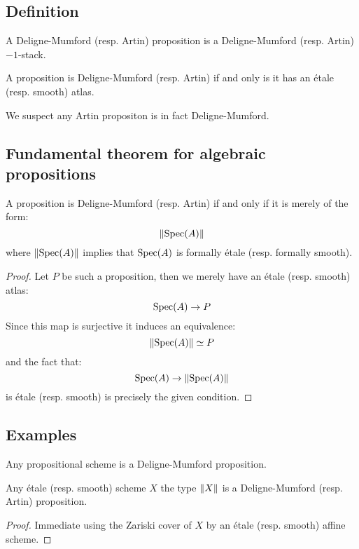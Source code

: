\subsection{Definition}

\begin{definition}
A Deligne-Mumford (resp. Artin) proposition is a Deligne-Mumford (resp. Artin) $-1$-stack.
\end{definition}

\begin{remark}
A proposition is Deligne-Mumford (resp. Artin) if and only is it has an étale (resp. smooth) atlas.
\end{remark}

We suspect any Artin propositon is in fact Deligne-Mumford.

\subsection{Fundamental theorem for algebraic propositions}

\begin{proposition}
A proposition is Deligne-Mumford (resp. Artin) if and only if it is merely of the form:
\[\lVert \operatorname{Spec}(A) \rVert\]
where $\lVert \operatorname{Spec}(A) \rVert$ implies that $\operatorname{Spec}(A)$ is formally étale (resp. formally smooth).
\end{proposition}

\begin{proof}
Let $P$ be such a proposition, then we merely have an étale (resp. smooth) atlas:
\[\operatorname{Spec}(A)\to P\]
Since this map is surjective it induces an equivalence:
\[\lVert \operatorname{Spec}(A) \rVert \simeq P\]
and the fact that:
\[\operatorname{Spec}(A)\to \lVert \operatorname{Spec}(A) \rVert\]
is étale (resp. smooth) is precisely the given condition.
\end{proof}

\subsection{Examples}

\begin{remark}
Any propositional scheme is a Deligne-Mumford proposition.
\end{remark}

\begin{lemma}
Any étale (resp. smooth) scheme $X$ the type $\lVert X \rVert$ is a Deligne-Mumford (resp. Artin) proposition.
\end{lemma}

\begin{proof}
Immediate using the Zariski cover of $X$ by an étale (resp. smooth) affine scheme.
\end{proof}


